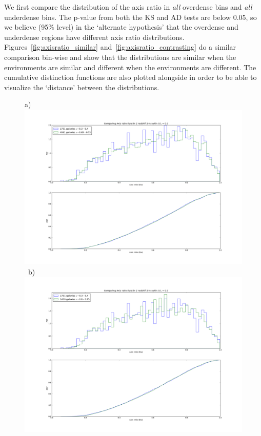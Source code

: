 \documentclass[twocolumn,useAMS,usenatbib]{mn2e}
\begin{document}
We first compare the distribution of the axis ratio in \emph{all} overdense bins and \emph{all} underdense bins. The p-value from both the KS and AD tests are below 0.05, 
so we believe (95\% level) in the `alternate hypothesis' that the overdense and underdense regions have different axis ratio distributions.
Figures~\ref{fig:axisratio_similar} and~\ref{fig:axisratio_contrasting} do a similar comparison bin-wise and show that the distributions are similar when the environments are similar and different when the environments are different.
The cumulative distinction functions are also plotted alongside in order to be able to visualize the `distance' between the distributions.


\begin{figure}
 \centering
 a) \includegraphics[width=0.9\columnwidth]{axisratio(0)_0dot3-0dot4_0dot65-0dot75.png} \
 b) \includegraphics[width=0.9\columnwidth]{axisratio(0)_0dot3-0dot4_0dot80-0dot85.png} \\

\end{figure}
\end{document}
